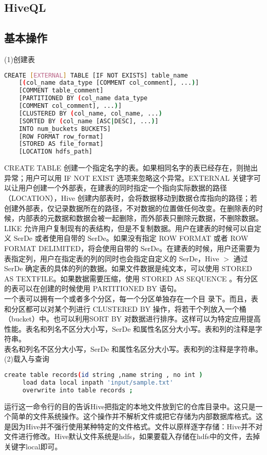 \documentclass[12pt]{article}
\begin{document}
\begin{CJK*}{UTF8}{gbsn}
\section{HiveQL}
\subsection{基本操作}
 (1)\quad 创建表
 \begin{lstlisting}[language=sh]
    CREATE [EXTERNAL] TABLE [IF NOT EXISTS] table_name
    [(col_name data_type [COMMENT col_comment], ...)]
    [COMMENT table_comment]
    [PARTITIONED BY (col_name data_type
    [COMMENT col_comment], ...)]
    [CLUSTERED BY (col_name, col_name, ...)
    [SORTED BY (col_name [ASC|DESC], ...)]
    INTO num_buckets BUCKETS]
    [ROW FORMAT row_format]
    [STORED AS file_format]
    [LOCATION hdfs_path]
\end{lstlisting}
\indent CREATE TABLE 创建一个指定名字的表。如果相同名字的表已经存在，则抛出异常；用户可以用 IF NOT EXIST 选项来忽略这个异常。EXTERNAL 关键字可以让用户创建一个外部表，在建表的同时指定一个指向实际数据的路径（LOCATION），Hive 创建内部表时，会将数据移动到数据仓库指向的路径；若创建外部表，仅记录数据所在的路径，不对数据的位置做任何改变。在删除表的时候，内部表的元数据和数据会被一起删除，而外部表只删除元数据，不删除数据。LIKE 允许用户复制现有的表结构，但是不复制数据。用户在建表的时候可以自定义 SerDe 或者使用自带的 SerDe。如果没有指定 ROW FORMAT 或者 ROW FORMAT DELIMITED，将会使用自带的 SerDe。在建表的时候，用户还需要为表指定列，用户在指定表的列的同时也会指定自定义的 SerDe，Hive $>$ 通过 SerDe 确定表的具体的列的数据。如果文件数据是纯文本，可以使用 STORED AS TEXTFILE。如果数据需要压缩，使用 STORED AS SEQUENCE 。有分区的表可以在创建的时候使用 PARTITIONED BY 语句。\\
\indent 一个表可以拥有一个或者多个分区，每一个分区单独存在一个目
录下。而且，表和分区都可以对某个列进行 CLUSTERED BY 操作，将若干个列放入一个桶（bucket）中。也可以利用SORT BY 对数据进行排序。这样可以为特定应用提高性能。表名和列名不区分大小写，SerDe 和属性名区分大小写。表和列的注释是字符串。\\
\indent 表名和列名不区分大小写，SerDe 和属性名区分大小写。表和列的注释是字符串。\\
 (2)\quad 载入与查询
 \begin{lstlisting}[language=sh]
 create table records(id string ,name string , no int ) 
     load data local inpath 'input/sample.txt' 
     overwrite into table records ;
\end{lstlisting}
 运行这一命令行的目的告诉Hive把指定的本地文件放到它的仓库目录中。这只是一个简单的文件系统操作。这个操作并不解析文件或把它存储为内部数据库格式。这是因为Hive并不强行使用某种特定的文件格式。文件以原样逐字存储：Hive并不对文件进行修改。Hive默认文件系统是hdfs，如果要载入存储在hdfs中的文件，去掉关键字local即可。\\

\end{CJK*}
\end{document}
